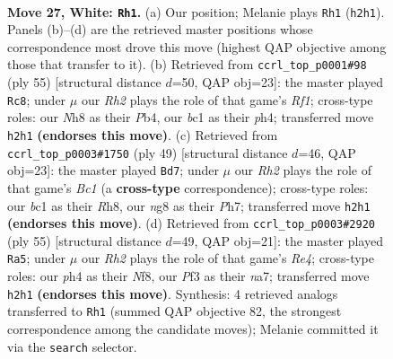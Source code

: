 \documentclass[11pt]{article}
\begin{document}
\clearpage

\begin{figure}[p]\centering
\begin{subfigure}{0.46\textwidth}\centering
\resizebox{\linewidth}{!}{%
\newchessgame
\chessboard[
  setfen={r1k3nN/3n4/8/pp2pbp1/7p/5P1P/P4KPR/2b5 w - - 0 27},
  showmover=false,
  pgfstyle=straightmove, color=movearrow, markmove={h2-h1}
]}
\caption{}
\end{subfigure}\hfill
\begin{subfigure}{0.46\textwidth}\centering
\resizebox{\linewidth}{!}{%
\newchessgame
\chessboard[
  setfen={5r2/3pkp2/6pp/3B4/1p3P1P/2b3P1/P5K1/3R4 b - - 0 28},
  showmover=false,
  pgfstyle=straightmove, color=movearrow, markmove={f8-c8}
]}
\caption{}
\end{subfigure}
\\[4pt]
\begin{subfigure}{0.46\textwidth}\centering
\resizebox{\linewidth}{!}{%
\newchessgame
\chessboard[
  setfen={2b4r/4kppp/1p2p3/4P3/2BPpP2/8/P2K2PP/7R b - - 1 25},
  showmover=false,
  pgfstyle=straightmove, color=movearrow, markmove={c8-d7}
]}
\caption{}
\end{subfigure}\hfill
\begin{subfigure}{0.46\textwidth}\centering
\resizebox{\linewidth}{!}{%
\newchessgame
\chessboard[
  setfen={5nk1/Nb3p2/1p2p2p/4r1p1/2BR4/P5P1/1P3PP1/5K2 b - - 1 28},
  showmover=false,
  pgfstyle=straightmove, color=movearrow, markmove={e5-a5}
]}
\caption{}
\end{subfigure}
\caption{\textbf{Move 27, White: \texttt{Rh1}.} (a) Our position; Melanie plays \texttt{Rh1} (\texttt{h2h1}). Panels (b)--(d) are the retrieved master positions whose correspondence most drove this move (highest QAP objective among those that transfer to it). (b) Retrieved from \texttt{ccrl\_top\_p0001\#98} (ply 55) [structural distance $d$=50, QAP obj=23]: the master played \texttt{Rc8}; under $\mu$ our \emph{Rh2} plays the role of that game's \emph{Rf1}; cross-type roles: our \emph{N}h8 as their \emph{P}b4, our \emph{b}c1 as their \emph{p}h4; transferred move \texttt{h2h1} \textbf{(endorses this move)}. (c) Retrieved from \texttt{ccrl\_top\_p0003\#1750} (ply 49) [structural distance $d$=46, QAP obj=23]: the master played \texttt{Bd7}; under $\mu$ our \emph{Rh2} plays the role of that game's \emph{Bc1} (a \textbf{cross-type} correspondence); cross-type roles: our \emph{b}c1 as their \emph{R}h8, our \emph{n}g8 as their \emph{P}h7; transferred move \texttt{h2h1} \textbf{(endorses this move)}. (d) Retrieved from \texttt{ccrl\_top\_p0003\#2920} (ply 55) [structural distance $d$=49, QAP obj=21]: the master played \texttt{Ra5}; under $\mu$ our \emph{Rh2} plays the role of that game's \emph{Re4}; cross-type roles: our \emph{p}h4 as their \emph{N}f8, our \emph{P}f3 as their \emph{n}a7; transferred move \texttt{h2h1} \textbf{(endorses this move)}. Synthesis: 4 retrieved analogs transferred to \texttt{Rh1} (summed QAP objective 82, the strongest correspondence among the candidate moves); Melanie committed it via the \texttt{search} selector.}
\label{fig:thought-m52}
\end{figure}
\end{document}
